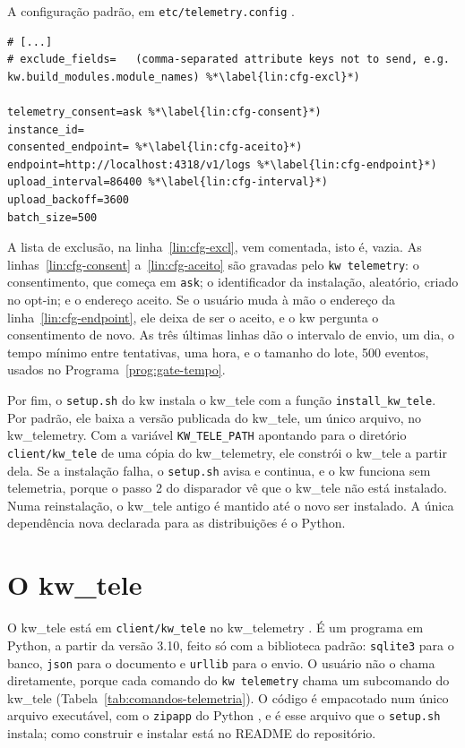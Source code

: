 \begin{programruledcaption}{A configuração padrão, em \texttt{etc/\allowbreak{}telemetry.config}
    \citep{kwfork_telemetry}.
    \label{prog:config}}
\begin{lstlisting}[style=wider]
# [...]
# exclude_fields=   (comma-separated attribute keys not to send, e.g. kw.build_modules.module_names) %*\label{lin:cfg-excl}*)

telemetry_consent=ask %*\label{lin:cfg-consent}*)
instance_id=
consented_endpoint= %*\label{lin:cfg-aceito}*)
endpoint=http://localhost:4318/v1/logs %*\label{lin:cfg-endpoint}*)
upload_interval=86400 %*\label{lin:cfg-interval}*)
upload_backoff=3600
batch_size=500
\end{lstlisting}
\end{programruledcaption}

A lista de exclusão, na linha~\ref{lin:cfg-excl}, vem comentada, isto é,
vazia. As linhas~\ref{lin:cfg-consent} a~\ref{lin:cfg-aceito} são gravadas pelo
\texttt{kw telemetry}: o consentimento, que começa em \texttt{ask}; o
identificador da instalação, aleatório, criado no opt-in; e o endereço aceito.
Se o usuário muda à mão o endereço da linha~\ref{lin:cfg-endpoint}, ele deixa
de ser o aceito, e o kw pergunta o consentimento de novo. As três últimas
linhas dão o intervalo de envio, um dia, o tempo mínimo entre tentativas, uma
hora, e o tamanho do lote, 500 eventos, usados no
Programa~\ref{prog:gate-tempo}.

Por fim, o \texttt{setup.sh} do kw instala o kw\_tele com a função
\texttt{install\_kw\_tele}. Por padrão, ele baixa a versão publicada do
kw\_tele, um único arquivo, no kw\_telemetry. Com a variável
\texttt{KW\_TELE\_PATH} apontando para o diretório \texttt{client/kw\_tele}
de uma cópia do kw\_telemetry, ele constrói o kw\_tele a partir dela. Se a
instalação falha, o \texttt{setup.sh} avisa e continua, e o kw funciona sem
telemetria, porque o passo 2 do disparador vê que o kw\_tele não está
instalado. Numa reinstalação, o kw\_tele antigo é mantido até o novo ser
instalado. A única dependência nova declarada para as distribuições é o
Python.

\section{O kw\_tele}
\label{sec:impl-kwtele}

O kw\_tele está em \texttt{client/kw\_tele} no kw\_telemetry
\citep{kwtelemetry_repo}. É um programa em Python, a partir da versão 3.10, feito só
com a biblioteca padrão: \texttt{sqlite3} para o banco, \texttt{json} para o
documento e \texttt{urllib} para o envio. O usuário não o chama diretamente, porque
cada comando do \texttt{kw telemetry} chama um subcomando do kw\_tele
(Tabela~\ref{tab:comandos-telemetria}). O código é empacotado num único
arquivo executável, com o \texttt{zipapp} do Python \citep{python310_zipapp},
e é esse arquivo que o \texttt{setup.sh} instala; como construir e instalar
está no README do repositório.

